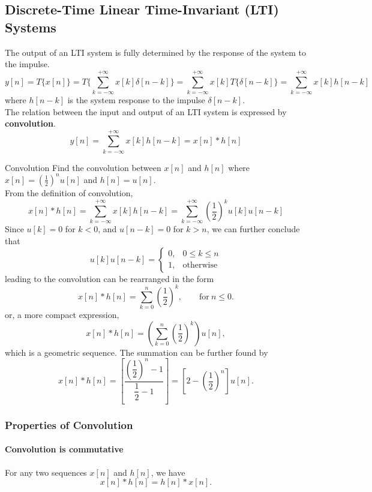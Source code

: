\subsection{Discrete-Time Linear Time-Invariant (LTI) Systems}
The output of an LTI system is fully determined by the response of the system to the impulse. 
\[
    y[n] 
    = T\{x[n]\}
    = T \bigg\{\sum_{k=-\infty}^{+\infty} x[k] \delta[n-k] \bigg\}
    = \sum_{k=-\infty}^{+\infty} x[k] T \{\delta[n-k]\}
    = \sum_{k=-\infty}^{+\infty} x[k] h[n-k]
\]
where $h[n-k]$ is the system response to the impulse $\delta[n-k]$.\\

The relation between the input and output of an LTI system is expressed by \textbf{convolution}. 
\[
    y[n] = \sum_{k=-\infty}^{+\infty} x[k] h[n-k] = x[n] * h[n]
\]

\begin{ex}{Convolution}
    Find the convolution between $x[n]$ and $h[n]$ where $x[n] = \left(\frac{1}{2} \right)^n u[n]$ and $h[n] = u[n]$. \\
    
    From the definition of convolution,
    \[
        x[n] * h[n] = \sum_{k=-\infty}^{+\infty} x[k] h[n-k] = \sum_{k=-\infty}^{+\infty} \left(\dfrac{1}{2} \right)^k u[k] u[n-k]
    \]
    Since $u[k] = 0$ for $k<0$, and $u[n-k] = 0$ for $k>n$, we can further conclude that
    \[
        u[k] u[n-k] = 
        \begin{cases}
        0, & 0 \leq k \leq n \\
        1, & \text{otherwise}
        \end{cases}
    \]
    leading to the convolution can be rearranged in the form
    \[
        x[n] * h[n] = \sum_{k=0}^{n} \left(\dfrac{1}{2} \right)^k, \quad \quad \text{for} \ n \leq 0.
    \]
    or, a more compact expression,
    \[
         x[n] * h[n] = \left( \sum_{k=0}^{n} \left(\dfrac{1}{2} \right)^k \right) u[n],
    \]
    which is a geometric sequence. The summation can be further found by
    \[
         x[n] * h[n] = \left[ \frac{\left(\dfrac{1}{2} \right)^n - 1}{\dfrac{1}{2} - 1} \right] = \left[ 2 - \left( \dfrac{1}{2} \right)^n \right] u[n].
    \]
\end{ex}

\subsubsection{Properties of Convolution}
\paragraph{Convolution is commutative} For any two sequences $x[n]$ and $h[n]$, we have 
\[
    x[n] * h[n] = h[n] * x[n].
\]

